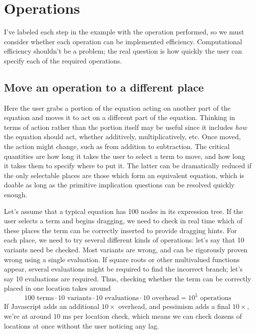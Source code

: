 \documentclass[11pt]{article}
\newcommand{\blue}[1]{{\color{blue} #1}}
\begin{document}
\section{Operations}

I've labeled each step in the example with the operation performed, so we must consider whether each operation
can be implemented efficiency.  Computational efficiency shouldn't be a problem; the real question is how quickly
the user can specify each of the required operations.

\subsection{\blue{Move an operation to a different place}}
Here the user grabs a portion of the equation
acting on another part of the equation and moves it to act on a different part of the equation.  Thinking in
terms of action rather than the portion itself may be useful since it includes \emph{how} the equation should
act, whether additively, multiplicatively, etc.  Once moved, the action might change, such as from
addition to subtraction.  The critical quantities are how long it takes the user to select a term to move,
and how long it takes them to specify where to put it.  The latter can be dramatically reduced if the only
selectable places are those which form an equivalent equation, which is doable as long as the primitive
implication questions can be resolved quickly enough.

Let's assume that a typical equation has 100 nodes in its expression tree.  If the user
selects a term and begins dragging, we need to check in real time which of these places the term can be
correctly inserted to provide dragging hints.  For each place, we need to try several different kinds of
operations: let's say that 10 variants need be checked.  Most variants are wrong, and can be rigorously
proven wrong using a single evaluation.  If square roots or other multivalued functions appear, several
evaluations might be required to find the incorrect branch; let's say 10 evaluations are required.  Thus,
checking whether the term can be correctly placed in one location takes around
$$100 \textrm{~terms} \cdot 10 \textrm{~variants} \cdot 10 \textrm{~evaluations} \cdot 10 \textrm{~overhead}
= 10^5 \textrm{~operations}$$
If Javascript adds an additional $10\times$ overhead, and pessimism adds a final $10\times$, we're at around
$10\textrm{~ms}$ per location check, which means we can check dozens of locations at once without the user
noticing any lag.
\end{document}
